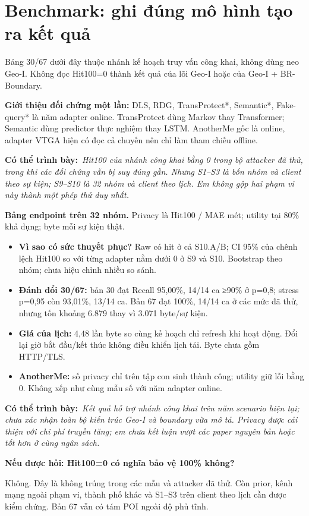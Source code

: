 \documentclass[10pt,a4paper]{article}
\newcommand{\key}[1]{\par\smallskip\noindent\colorbox{pale}{\parbox{\dimexpr\linewidth-2\fboxsep}{#1}}\par\smallskip}
\newcommand{\say}[1]{\par\textbf{Có thể trình bày:}\ \textit{#1}\par}
\newcommand{\ask}[2]{\par\textbf{Nếu được hỏi: #1}\par #2\par}
\begin{document}
\clearpage\section{Benchmark: ghi đúng mô hình tạo ra kết quả}
\key{Bảng 30/67 dưới đây thuộc nhánh kế hoạch truy vấn công khai, không dùng neo Geo-I. Không đọc Hit100=0 thành kết quả của lõi Geo-I hoặc của Geo-I + BR-Boundary.}
\textbf{Giới thiệu đối chứng một lần:} DLS, RDG, TransProtect*, Semantic*, Fake-query* là năm adapter online. TransProtect dùng Markov thay Transformer; Semantic dùng predictor thực nghiệm thay LSTM. AnotherMe gốc là online, adapter VTGA hiện có đọc cả chuyến nên chỉ làm tham chiếu offline.
\PrivacyEvidence
\say{Hit100 của nhánh công khai bằng 0 trong bộ attacker đã thử, trong khi các đối chứng vẫn bị suy đúng gần. Nhưng S1–S3 là bốn nhóm và client theo sự kiện; S9–S10 là 32 nhóm và client theo lịch. Em không gộp hai phạm vi này thành một phép thử duy nhất.}

\textbf{Bảng endpoint trên 32 nhóm.} Privacy là Hit100 / MAE mét; utility tại 80\% khả dụng; byte mỗi sự kiện thật.
\EndpointEvidence
\begin{itemize}
\item \textbf{Vì sao có sức thuyết phục?} Raw có hit ở cả S10.A/B; CI 95\% của chênh lệch Hit100 so với từng adapter nằm dưới 0 ở S9 và S10. Bootstrap theo nhóm; chưa hiệu chỉnh nhiều so sánh.
\item \textbf{Đánh đổi 30/67:} bản 30 đạt Recall 95,00\%, 14/14 ca ≥90\% ở p=0,8; stress p=0,95 còn 93,01\%, 13/14 ca. Bản 67 đạt 100\%, 14/14 ca ở các mức đã thử, nhưng tốn khoảng 6.879 thay vì 3.071 byte/sự kiện.
\item \textbf{Giá của lịch:} 4,48 lần byte so cùng kế hoạch chỉ refresh khi hoạt động. Đổi lại giờ bắt đầu/kết thúc không điều khiển lịch tải. Byte chưa gồm HTTP/TLS.
\item \textbf{AnotherMe:} số privacy chỉ trên tập con sinh thành công; utility giữ lỗi bằng 0. Không xếp như cùng mẫu số với năm adapter online.
\end{itemize}
\say{Kết quả hỗ trợ nhánh công khai trên năm scenario hiện tại; chưa xác nhận toàn bộ kiến trúc Geo-I và boundary vừa mô tả. Privacy được cải thiện với chi phí truyền tăng; em chưa kết luận vượt các paper nguyên bản hoặc tốt hơn ở cùng ngân sách.}
\ask{Hit100=0 có nghĩa bảo vệ 100\% không?}{Không. Đây là không trúng trong các mẫu và attacker đã thử. Còn prior, kênh mạng ngoài phạm vi, thành phố khác và S1–S3 trên client theo lịch cần được kiểm chứng. Bản 67 vẫn có tám POI ngoài độ phủ tĩnh.}

\clearpage

\end{document}
